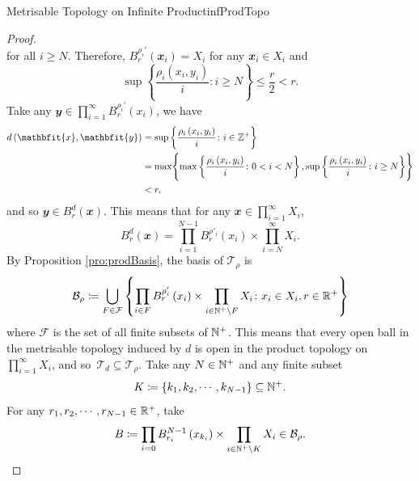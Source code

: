 \documentclass[math]{amznotes}
\theoremstyle{remark}
\begin{document}
\begin{probox}{Metrisable Topology on Infinite Product}{infProdTopo}
\begin{proof}
\begin{equation*}
        \end{equation*}
        for all $i \geq N$. Therefore, $B_r^{\rho_i'}\left(\mathbfit{x}_i\right) = X_i$ for any $\mathbfit{x}_i \in X_i$ and
        \begin{equation*}
            \sup\left\{\frac{\rho_{i}\left(x_i, y_i\right)}{i} \colon i \geq N\right\} \leq \frac{r}{2} < r.
        \end{equation*}
        Take any $\mathbfit{y} \in \prod_{i = 1}^{\infty}B_r^{\rho_i'}\left(x_i\right)$, we have 
        \begin{align*}
            d\left(\mathbfit{x}, \mathbfit{y}\right) & = \sup \left\{\frac{\rho_{i}\left(x_i, y_i\right)}{i} \colon i \in \Z^+\right\} \\
            & = \max\Biggl\{\max\left\{\frac{\rho_{i}\left(x_i, y_i\right)}{i} \colon 0 < i < N\right\}, \sup\left\{\frac{\rho_{i}\left(x_i, y_i\right)}{i} \colon i \geq N\right\}\Biggr\} \\
            & < r,
        \end{align*}
        and so $\mathbfit{y} \in B_r^d\left(\mathbfit{x}\right)$. This means that for any $\mathbfit{x} \in \prod_{i = 1}^{\infty}X_i$, 
        \begin{equation*}
            B_r^d\left(\mathbfit{x}\right) = \prod_{i = 1}^{N - 1}B_r^{\rho'_i}\left(x_i\right) \times \prod_{i = N}^{\infty}X_i.
        \end{equation*}
        By Proposition \ref{pro:prodBasis}, the basis of $\mathcal{T}_{\rho}$ is 
        \begin{equation*}
            \mathcal{B}_{\rho} \coloneqq \bigcup_{F \in \mathcal{F}}\left\{\prod_{i \in F}B_r^{\rho'_i}\left(x_i\right) \times \prod_{i \in \mathbb{N}^+ \setminus F}X_i \colon x_i \in X_i, r \in \mathbb{R}^+\right\}
        \end{equation*}
        where $\mathcal{F}$ is the set of all finite subsets of $\mathbb{N}^+$. This means that every open ball in the metrisable topology induced by $d$ is open in the product topology on $\prod_{i = 1}^{\infty}X_i$, and so~$\mathcal{T}_d \subseteq \mathcal{T}_{\rho}$. Take any $N \in \mathbb{N}^+$ and any finite subset 
        \begin{equation*}
            K \coloneqq \left\{k_1, k_2, \cdots, k_{N - 1}\right\} \subseteq \mathbb{N}^+.
        \end{equation*}
        For any $r_1, r_2, \cdots, r_{N - 1} \in \mathbb{R}^+$, take 
        \begin{equation*}
            B \coloneqq \prod_{i = 0}B_{r_i}^{N - 1}\left(x_{k_i}\right) \times \prod_{i \in \N^+ \setminus K}X_i \in \mathcal{B}_{\rho}.

\end{equation*}
\end{proof}
\end{probox}
\end{document}
